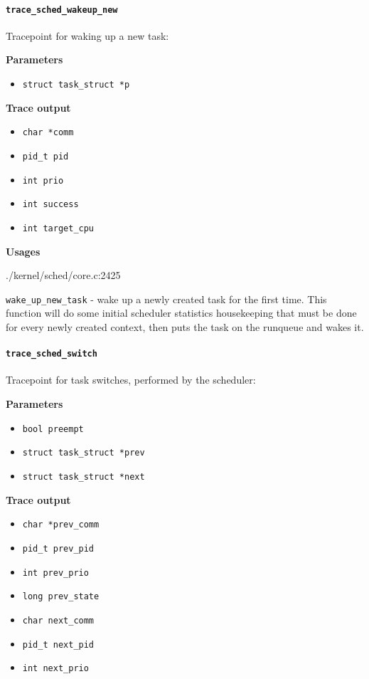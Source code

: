 \paragraph{\texttt{trace\_sched\_wakeup\_new}}
Tracepoint for waking up a new task:

\textbf{Parameters}
\begin{itemize}
    \item \verb|struct task_struct *p|
\end{itemize}

\textbf{Trace output}
\begin{itemize}
    \item \verb|char *comm|
    \item \verb|pid_t pid|
    \item \verb|int prio|
    \item \verb|int success|
    \item \verb|int target_cpu|
\end{itemize}

\textbf{Usages}
\begin{code}
./kernel/sched/core.c:2425
\end{code}
\verb|wake_up_new_task| - wake up a newly created task for the first time.
This function will do some initial scheduler statistics housekeeping
that must be done for every newly created context, then puts the task
on the runqueue and wakes it.
   
\paragraph{\texttt{trace\_sched\_switch}}
Tracepoint for task switches, performed by the scheduler:

\textbf{Parameters}
\begin{itemize}
    \item \verb|bool preempt|
    \item \verb|struct task_struct *prev|
    \item \verb|struct task_struct *next|
\end{itemize}

\textbf{Trace output}
\begin{itemize}
    \item \verb|char *prev_comm|
    \item \verb|pid_t prev_pid|
    \item \verb|int prev_prio|
    \item \verb|long prev_state|
    \item \verb|char next_comm|
    \item \verb|pid_t next_pid|
    \item \verb|int next_prio|
\end{itemize}

